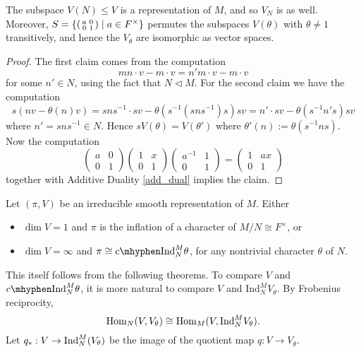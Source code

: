 \begin{lemma}\label{coinvariants}
	The subspace $V(N) \leq V$ is a representation of $M$, and so $V_N$ is as well. Moreover, $S = \{\begin{psmallmatrix}
        a&0\\0&1
    \end{psmallmatrix} \mid a \in F^\times\}$ permutes the subspaces $V(\theta)$ with $\theta \not= 1$ transitively, and hence the $V_\theta$ are isomorphic as vector spaces.
\end{lemma}
\begin{proof}
	The first claim comes from the computation 
	$$mn\cdot v - m\cdot v = n'm\cdot v - m\cdot v$$ for some $n' \in N$, using the fact that $N \lhd M$. For the second claim we have the computation
	\[s(nv - \theta(n)v) = sns^{-1}\cdot sv - \theta (s^{-1}(sns^{-1})s)sv = n'\cdot sv - \theta(s^{-1}n's) sv\]
	where $n' = sns^{-1}\in N$. Hence $sV(\theta) = V(\theta')$ where $\theta'(n) := \theta(s^{-1}ns)$. Now the computation
	\[\begin{pmatrix}
		a & 0 \\ 0 & 1
	\end{pmatrix}\begin{pmatrix}
		1 & x \\ 0 & 1
	\end{pmatrix}\begin{pmatrix}
		a^{-1} & 1 \\ 0 & 1
	\end{pmatrix} = \begin{pmatrix}
		1 & ax \\ 0 & 1
	\end{pmatrix}\]
	together with Additive Duality \ref{add_dual} implies the claim.
\end{proof}



\begin{thm}\label{inf dim}
    Let $(\pi,V)$ be an irreducible smooth representation of $M$. Either 
    \begin{itemize}
        \item $\dim V=1$ and $\pi$ is the inflation of a character of $M/N \cong F^\times$, or
        \item $\dim V = \infty$ and $\pi \cong \cInd_N^M \theta$, for any nontrivial character $\theta$ of $N$.
    \end{itemize}
\end{thm}

This itself follows from the following theorems. To compare $V$ and $\cInd_N^M \theta$, it is more natural to compare $V$ and $\mathrm{Ind}_N^M V_\theta$. By Frobenius reciprocity,
$$\mathrm{Hom}_N(V,V_\theta) \cong \mathrm{Hom}_M(V,\mathrm{Ind}_N^M V_\theta).$$
Let $q_*: V \to \mathrm{Ind}_N^M(V_\theta)$ be the image of the quotient map $q: V \to V_\theta$.

